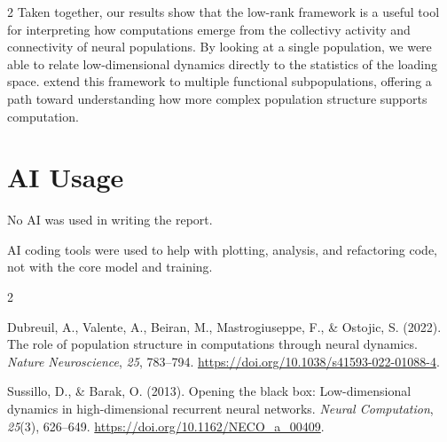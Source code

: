 \documentclass[10pt]{article}
\begin{document}
\begin{multicols}{2}
Taken together, our results show that the low-rank framework is a useful tool for interpreting how computations emerge from the collectivy activity and connectivity of neural populations. By looking at a single population, we were able to relate low-dimensional dynamics directly to the statistics of the loading space. \citet{dubreuil2022} extend this framework to multiple functional subpopulations, offering a path toward understanding how more complex population structure supports computation.

\section{AI Usage}

No AI was used in writing the report.

AI coding tools were used to help with plotting, analysis, and refactoring code, not with the core model and training.

\begin{thebibliography}{2}
\footnotesize

Dubreuil, A., Valente, A., Beiran, M., Mastrogiuseppe, F., \& Ostojic, S. (2022).
The role of population structure in computations through neural dynamics.
\emph{Nature Neuroscience}, \emph{25}, 783--794.
\url{https://doi.org/10.1038/s41593-022-01088-4}.

Sussillo, D., \& Barak, O. (2013).
Opening the black box: Low-dimensional dynamics in high-dimensional recurrent neural networks.
\emph{Neural Computation}, \emph{25}(3), 626--649.
\url{https://doi.org/10.1162/NECO_a_00409}.

\end{thebibliography}

\end{multicols}
\end{document}
